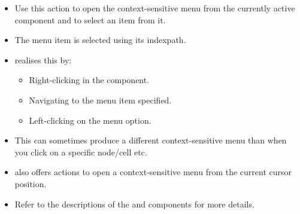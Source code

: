 \begin{itemize}
\item Use this action to open the context-sensitive menu from the currently active component and to select an item from it.
\item The menu item is selected using its indexpath. 
\item \app{} realises this by:
\begin{itemize}
\item Right-clicking in the component.
\item Navigating to the menu item specified.
\item Left-clicking on the menu option.  
\end{itemize}
\item This can sometimes produce a different context-sensitive menu than when you click on a specific node/cell etc.
\item \app{} also offers actions to open a context-sensitive menu from the current cursor position. 
\item Refer to the descriptions of the  and  components for more details. 

\end{itemize}

  